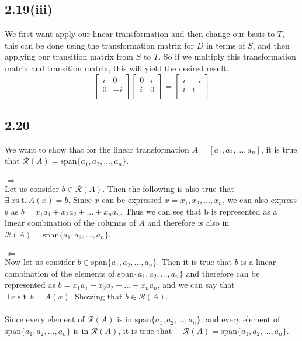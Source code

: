 \documentclass[letterpaper,12pt]{article}
\theoremstyle{definition}
\begin{document}
\subsection*{2.19(iii)}
We first want apply our linear transformation and then change our basis to $T$, this can be done using the transformation matrix for $D$ in terms of $S$, and then applying our transition matrix from $S$ to $T$. So if we multiply this transformation matrix and transition matrix, this will yield the desired result.
\[
\begin{bmatrix}
i & 0 \\
0 & -i \\
\end{bmatrix}
\begin{bmatrix}
0 & i \\
i & 0 \\
\end{bmatrix}
= 
\begin{bmatrix}
i & -i \\
i & i \\
\end{bmatrix}
\]

\subsection*{2.20}
We want to show that for the linear transformation $A = [a_1, a_2, \dots,a_n]$, it is true that 
$\mathscr{R}(A) = \text{span}\{a_1, a_2, \dots,a_n\}$. \\ \\
$\Rightarrow$ \\
Let us consider $b \in \mathscr{R}(A)$. Then the following is also true that 
$\exists ~ x \text{s.t.} ~ A(x) = b$. Since $x$ can be expressed $x = x_1, x_2, \dots, x_n$, 
we can also express $b$ as $b=x_1a_1+x_2a_2+\dots+x_na_n$. Thus we can see that b is represented 
as a linear combination of the columns of $A$ and therefore is also in $\mathscr{R}(A) = 
\text{span}\{a_1, a_2, \dots,a_n\}$. \\
\\
$\Leftarrow$ \\
Now let us consider $b \in \text{span}\{a_1, a_2, \dots,a_n\}$. Then it is true that 
$b$ is a linear combination of the elements of $\text{span}\{a_1, a_2, \dots,a_n\}$ 
and therefore can be represented as $b=x_1a_1+x_2a_2+\dots+x_na_n$, and we can say that $\exists ~ x 
~ \text{s.t.} ~ b=A(x)$. Showing that $b \in \mathscr{R}(A)$. \\
\\
Since every element of $\mathscr{R}(A)$ is in $\text{span}\{a_1, a_2, \dots,a_n\}$, and every element
of $\text{span}\{a_1, a_2, \dots,a_n\}$ is in $\mathscr{R}(A)$, it is true that  
$\mathscr{R}(A) = \text{span}\{a_1, a_2, \dots,a_n\}$.
\end{document}
